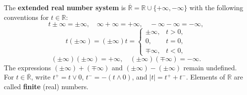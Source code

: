 The \textbf{extended real number system} is $\overline{\mathbb{R}} = \mathbb{R} \cup \{+\infty, -\infty\}$ with the following conventions for $t \in \mathbb{R}$:
$$t \pm \infty = \pm \infty, \quad \infty + \infty = +\infty, \quad -\infty - \infty = -\infty,$$
$$t(\pm \infty) = (\pm \infty)t = \begin{cases} \pm \infty, & t > 0, \\ 0, & t = 0, \\ \mp \infty, & t < 0, \end{cases}$$
$$(\pm \infty)(\pm \infty) = +\infty, \quad (\pm \infty)(\mp \infty) = -\infty.$$
The expressions $(\pm \infty) + (\mp \infty)$ and $(\pm \infty) - (\pm \infty)$ remain undefined. For $t \in \overline{\mathbb{R}}$, write $t^+ = t \vee 0$, $t^- = -(t \wedge 0)$, and $|t| = t^+ + t^-$. Elements of $\mathbb{R}$ are called \textbf{finite} (real) numbers.
